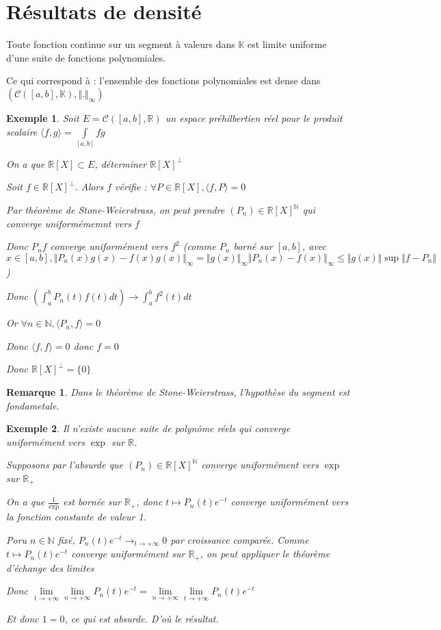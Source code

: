\documentclass[a4paper,12pt]{book}
\newcommand{\Thr}[2]{\begin{tcolorbox}[sharp corners, colback=white,colframe=red!90!black!75, title=Théorème : #1]#2\end{tcolorbox}}
\newtheorem{Exe}{Exemple}[section]
\newtheorem{Rem}{Remarque}[section]
\def\R{\mathbb{R}}
\def\N{\mathbb{N}}
\def\K{\mathbb{K}}
\begin{document}
\section{Résultats de densité}
\Thr{Stone-Weierstrass (admis)}{Toute fonction continue sur un segment à valeurs dans $\K$ est limite uniforme d'une suite de fonctions polynomiales.
\par Ce qui correspond à : l'ensemble des fonctions polynomiales est dense dans $(\mathcal{C}([a,b],\K),\Vert.\Vert_\infty)$}
\begin{Exe}
Soit $E=\mathcal{C}([a,b],\R)$ un espace préhilbertien réel pour le produit scalaire $\langle f,g\rangle = \int\limits_{[a,b]}fg$ \par On a que $\R[X]\subset E$, déterminer $\R[X]^\perp$ \par Soit $f\in\R[X]^\perp$. Alors $f$ vérifie : $\forall P\in \R[X], \langle f,P\rangle = 0$
\par Par théorème de Stone-Weierstrass, on peut prendre $(P_n)\in\R[X]^\N$ qui converge uniformémemnt vers $f$ \par Donc $P_nf$ converge uniformément vers $f^2$ (comme $P_n$ borné sur $[a,b]$, avec $x\in[a,b], \Vert P_n(x)g(x)-f(x)g(x)\Vert_\infty=\Vert g(x)\Vert_\infty\Vert P_n(x)-f(x)\Vert_\infty\leq\Vert g(x)\Vert\sup\Vert f-P_n\Vert$)
\par Donc $\left(\int_a^bP_n(t)f(t)dt\right)\to \int_a^bf^2(t)dt$ \par Or $\forall n\in\N, \langle P_n,f\rangle=0$ \par Donc $\langle f,f\rangle=0$ donc $f=0$ \par Donc $\R[X]^\perp=\{0\}$
\end{Exe}
\begin{Rem}
Dans le théorème de Stone-Weierstrass, l'hypothèse du segment est fondametale.
\end{Rem}
\begin{Exe}
Il n'existe aucune suite de polynôme réels qui converge uniformément vers $\exp$ sur $\R$.
\par Supposons par l'absurde que $(P_n)\in\R[X]^\N$ converge uniformément vers $\exp$ sur $\R_+$ \par On a que $\frac{1}{\exp}$ est bornée sur $\R_+$, donc $t\mapsto P_n(t)e^{-t}$ converge uniformément vers la fonction constante de valeur 1.
\par Poru $n\in\N$ fixé, $P_n(t)e^{-t}\to_{t\to+\infty} 0$ par croissance comparée. Comme $t\mapsto P_n(t)e^{-t}$ converge uniformément sur $\R_+$, on peut appliquer le théorème d'échange des limites \par Donc $\lim\limits_{t\to+\infty}\lim\limits_{n\to+\infty}P_n(t)e^{-t}=\lim\limits_{n\to+\infty}\lim\limits_{t\to+\infty}P_n(t)e^{-t}$ \par Et donc $1=0$, ce qui est absurde. D'où le résultat.
\end{Exe}
\end{document}
